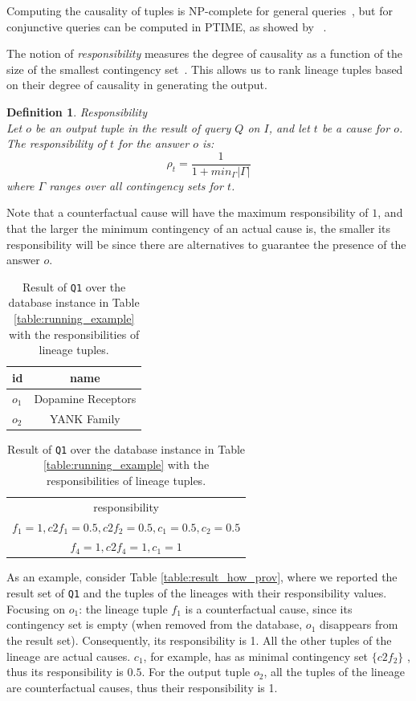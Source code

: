 \documentclass[preprint,12pt,sort&compress]{elsarticle}
\newtheorem{definition}{Definition}[section]
\begin{document}
Computing the causality of tuples is NP-complete for general queries~\cite{EiterL02}, but for conjunctive queries can be computed in PTIME, as showed by ~\citet{MeliouGMS11}. 


The notion of \emph{responsibility}  measures the degree of causality as a function of the size of the smallest contingency set~\cite{ChocklerH04}. This  allows us to rank lineage tuples based on their degree of causality in generating the output. 

\begin{definition}{Responsibility \cite{MeliouGMS11}}\\
\label{def:responsibility}
	Let $o$ be an output tuple in the result of query $Q$ on $I$, and let $t$ be a cause for $o$. The \emph{responsibility} of $t$ for the answer $o$ is:
	\[
		\rho_t = \frac{1}{1 + min_\Gamma|\Gamma|}
	\]
	where $\Gamma$ ranges over all contingency sets for $t$.
\end{definition}

Note that a counterfactual cause will have the maximum responsibility of $1$, and that the larger the minimum contingency of an actual cause is, the smaller its responsibility will be since there are alternatives to  guarantee the presence of the answer $o$.


\begin{table}[]
\footnotesize
\centering
  \begin{tabular}{|l|c|}
  \hline
    id & name\\
    \hline
    $o_1$ &  Dopamine Receptors\\
    $o_2$ & YANK Family\\
    \hline
  \end{tabular}
  \begin{tabular}{c}
  	responsibility   \\
  	$f_1=1, c2f_1=0.5, c2f_2=0.5, c_1=0.5, c_2=0.5$ \\
  	$f_4=1, c2f_4=1, c_1=1$ \\
  \end{tabular}
    \caption{Result of \texttt{Q1} over the database instance in Table \ref{table:running_example} with the responsibilities of lineage tuples.}
  \label{table:result_responsibility}
\end{table} 

As an example, consider Table \ref{table:result_how_prov}, where we reported the result set of \texttt{Q1} and the tuples of the lineages with their responsibility values. 
Focusing on $o_1$: the lineage tuple $f_1$ is a counterfactual cause, since its contingency set is empty (when removed from the database, $o_1$ disappears from the result set). Consequently, its responsibility is 1. All the other tuples of the lineage are actual causes. $c_1$, for example, has as minimal contingency set $\{c2f_2\}$ , thus its responsibility is $0.5$. 
For the output tuple $o_2$, all the tuples of the lineage are counterfactual causes, thus their responsibility is 1.
\end{document}
